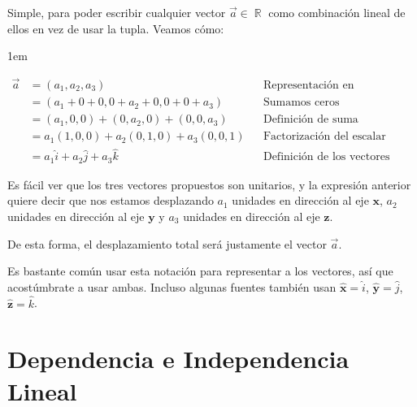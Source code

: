 \documentclass[12pt, fleqn]{report}                             %
\newenvironment{SmallIndentation}[1][0.75em]                    %
        {\begin{adjustwidth}{#1}{}\begin{footnotesize}}             %
        {\end{footnotesize}\end{adjustwidth}}                       %
\theoremstyle{break}                                            %
\DeclareMathOperator \Reals        {\mathbb{R}}                 %
\newcommand{\uVec}[1]{\mathbf{\hat{#1}}}                        %
\begin{document}
                    Simple, para poder escribir cualquier vector $\vec{a} \in \Reals$ como combinación
                    lineal de ellos en vez de usar la tupla.
                    Veamos cómo:
                    \begin{SmallIndentation}[1em]
                        \begin{align*}
                            \vec{a}
                                &= (a_1, a_2, a_3)                               &&\mbox{Representación en coordenadas}        \\
                                &= (a_1 + 0 + 0, 0 + a_2 + 0, 0 + 0 + a_3)       &&\mbox{Sumamos ceros convenientemente}       \\
                                &= (a_1, 0, 0) + (0, a_2, 0) + (0, 0, a_3)       &&\mbox{Definición de suma}                   \\
                                &= a_1(1, 0, 0) + a_2(0, 1, 0) + a_3(0, 0, 1)    &&\mbox{Factorización del escalar}            \\
                                &= a_1\hat{i} + a_2\hat{j} + a_3\hat{k}          &&\mbox{Definición de los vectores canónicos}
                        \end{align*}
                    \end{SmallIndentation}
                
                    Es fácil ver que los tres vectores propuestos son unitarios, y la expresión anterior
                    quiere decir que nos estamos desplazando $a_1$ unidades en dirección al eje $\mathbf{x}$,
                    $a_2$ unidades en dirección al eje $\mathbf{y}$ y $a_3$ unidades en dirección al eje
                    $\mathbf{z}$.

                    De esta forma, el desplazamiento total será justamente el vector $\vec{a}$.
                    
                    Es bastante común usar esta notación para representar a los vectores, así que acostúmbrate a usar ambas. 
                    Incluso algunas fuentes también usan $\uVec{x} = \hat{i}$, $\uVec{y} = \hat{j}$, $\uVec{z} = \hat{k}$.




        \clearpage
        \section{Dependencia e Independencia Lineal}
            
\end{document}
